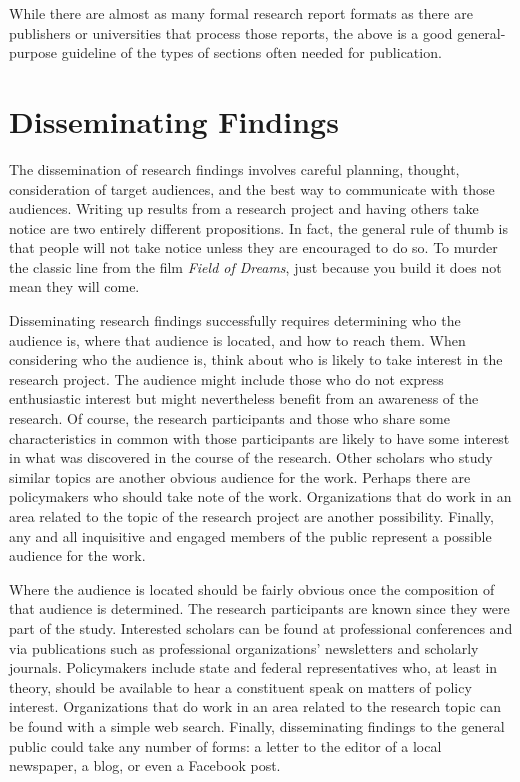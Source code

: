 While there are almost as many formal research report formats as there are publishers or universities that process those reports, the above is a good general-purpose guideline of the types of sections often needed for publication.

\section{Disseminating Findings}

The dissemination of research findings involves careful planning, thought, consideration of target audiences, and the best way to communicate with those audiences. Writing up results from a research project and having others take notice are two entirely different propositions. In fact, the general rule of thumb is that people will not take notice unless they are encouraged to do so. To murder the classic line from the film \textit{Field of Dreams}, just because you build it does not mean they will come.

Disseminating research findings successfully requires determining who the audience is, where that audience is located, and how to reach them. When considering who the audience is, think about who is likely to take interest in the research project. The audience might include those who do not express enthusiastic interest but might nevertheless benefit from an awareness of the research. Of course, the research participants and those who share some characteristics in common with those participants are likely to have some interest in what was discovered in the course of the research. Other scholars who study similar topics are another obvious audience for the work. Perhaps there are policymakers who should take note of the work. Organizations that do work in an area related to the topic of the research project are another possibility. Finally, any and all inquisitive and engaged members of the public represent a possible audience for the work.

Where the audience is located should be fairly obvious once the composition of that audience is determined. The research participants are known since they were part of the study. Interested scholars can be found at professional conferences and via publications such as professional organizations' newsletters and scholarly journals. Policymakers include state and federal representatives who, at least in theory, should be available to hear a constituent speak on matters of policy interest. Organizations that do work in an area related to the research topic can be found with a simple web search. Finally, disseminating findings to the general public could take any number of forms: a letter to the editor of a local newspaper, a blog, or even a Facebook post.

